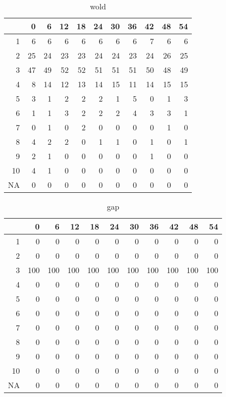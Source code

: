 \documentclass[11pt]{article}
\begin{document}
\begin{table}[H]
\centering
\begin{tabular}{rrrrrrrrrrr}
  \hline
 & 0 & 6 & 12 & 18 & 24 & 30 & 36 & 42 & 48 & 54 \\ 
  \hline
1 & 6 & 6 & 6 & 6 & 6 & 6 & 6 & 7 & 6 & 6 \\ 
  2 & 25 & 24 & 23 & 23 & 24 & 24 & 23 & 24 & 26 & 25 \\ 
  3 & 47 & 49 & 52 & 52 & 51 & 51 & 51 & 50 & 48 & 49 \\ 
  4 & 8 & 14 & 12 & 13 & 14 & 15 & 11 & 14 & 15 & 15 \\ 
  5 & 3 & 1 & 2 & 2 & 2 & 1 & 5 & 0 & 1 & 3 \\ 
  6 & 1 & 1 & 3 & 2 & 2 & 2 & 4 & 3 & 3 & 1 \\ 
  7 & 0 & 1 & 0 & 2 & 0 & 0 & 0 & 0 & 1 & 0 \\ 
  8 & 4 & 2 & 2 & 0 & 1 & 1 & 0 & 1 & 0 & 1 \\ 
  9 & 2 & 1 & 0 & 0 & 0 & 0 & 0 & 1 & 0 & 0 \\ 
  10 & 4 & 1 & 0 & 0 & 0 & 0 & 0 & 0 & 0 & 0 \\ 
  NA & 0 & 0 & 0 & 0 & 0 & 0 & 0 & 0 & 0 & 0 \\ 
   \hline
\end{tabular}
\caption{wold} 
\end{table}
\begin{table}[H]
\centering
\begin{tabular}{rrrrrrrrrrr}
  \hline
 & 0 & 6 & 12 & 18 & 24 & 30 & 36 & 42 & 48 & 54 \\ 
  \hline
1 & 0 & 0 & 0 & 0 & 0 & 0 & 0 & 0 & 0 & 0 \\ 
  2 & 0 & 0 & 0 & 0 & 0 & 0 & 0 & 0 & 0 & 0 \\ 
  3 & 100 & 100 & 100 & 100 & 100 & 100 & 100 & 100 & 100 & 100 \\ 
  4 & 0 & 0 & 0 & 0 & 0 & 0 & 0 & 0 & 0 & 0 \\ 
  5 & 0 & 0 & 0 & 0 & 0 & 0 & 0 & 0 & 0 & 0 \\ 
  6 & 0 & 0 & 0 & 0 & 0 & 0 & 0 & 0 & 0 & 0 \\ 
  7 & 0 & 0 & 0 & 0 & 0 & 0 & 0 & 0 & 0 & 0 \\ 
  8 & 0 & 0 & 0 & 0 & 0 & 0 & 0 & 0 & 0 & 0 \\ 
  9 & 0 & 0 & 0 & 0 & 0 & 0 & 0 & 0 & 0 & 0 \\ 
  10 & 0 & 0 & 0 & 0 & 0 & 0 & 0 & 0 & 0 & 0 \\ 
  NA & 0 & 0 & 0 & 0 & 0 & 0 & 0 & 0 & 0 & 0 \\ 
   \hline
\end{tabular}
\caption{gap} 
\end{table}
\end{document}
